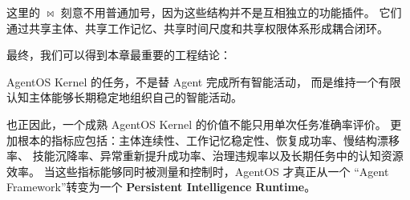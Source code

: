 \begin{statementbox}
\centering
{}
\end{statementbox}

这里的 $\bowtie$ 刻意不用普通加号，因为这些结构并不是互相独立的功能插件。
它们通过共享主体、共享工作记忆、共享时间尺度和共享权限体系形成耦合闭环。

最终，我们可以得到本章最重要的工程结论：

\begin{conclusion}
AgentOS Kernel 的任务，不是替 Agent 完成所有智能活动，
而是维持一个有限认知主体能够长期稳定地组织自己的智能活动。
\end{conclusion}

也正因此，一个成熟 AgentOS Kernel 的价值不能只用单次任务准确率评价。
更加根本的指标应包括：主体连续性、工作记忆稳定性、恢复成功率、慢结构漂移率、
技能沉降率、异常重新提升成功率、治理违规率以及长期任务中的认知资源效率。
当这些指标能够同时被测量和控制时，AgentOS 才真正从一个
``Agent Framework''转变为一个
\textbf{Persistent Intelligence Runtime}。
